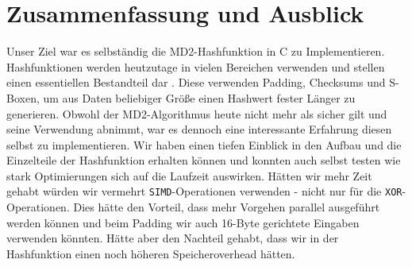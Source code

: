 \documentclass[course=erap]{aspdoc}
\begin{document}
\section{Zusammenfassung und Ausblick} \label{ss:fazit}


Unser Ziel war es selbständig die MD2-Hashfunktion in C zu Implementieren. Hashfunktionen werden heutzutage in vielen Bereichen verwenden und stellen einen essentiellen Bestandteil dar \cite{attack}. Diese verwenden Padding, Checksums und S-Boxen, um aus Daten beliebiger Größe einen Hashwert fester Länger zu generieren. Obwohl der MD2-Algorithmus heute nicht mehr als sicher gilt und seine Verwendung abnimmt, war es dennoch eine interessante Erfahrung diesen selbst zu implementieren. Wir haben einen tiefen Einblick in den Aufbau und die Einzelteile der Hashfunktion erhalten können und konnten auch selbst testen wie stark Optimierungen sich auf die Laufzeit auswirken. Hätten wir mehr Zeit gehabt würden wir vermehrt \texttt{SIMD}-Operationen verwenden - nicht nur für die \texttt{XOR}-Operationen. Dies hätte den Vorteil, dass mehr Vorgehen parallel ausgeführt werden können und beim Padding wir auch 16-Byte gerichtete Eingaben verwenden könnten. Hätte aber den Nachteil gehabt, dass wir in der Hashfunktion einen noch höheren Speicheroverhead hätten.


{}
\end{document}
